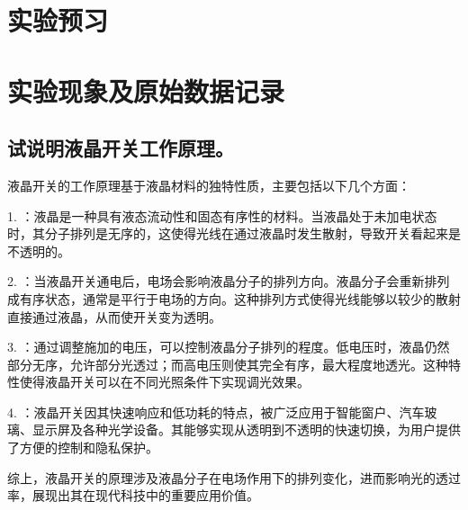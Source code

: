 \documentclass[signature=data]{physicsreport}
\begin{document}
\maketitle

\section{实验预习}


\makeatletter
{}
\makeatother


\section{实验现象及原始数据记录}


\makeatletter
{}
\makeatother

\newpage

\subsection{试说明液晶开关工作原理。}

液晶开关的工作原理基于液晶材料的独特性质，主要包括以下几个方面：

1. ：液晶是一种具有液态流动性和固态有序性的材料。当液晶处于未加电状态时，其分子排列是无序的，这使得光线在通过液晶时发生散射，导致开关看起来是不透明的。

2. ：当液晶开关通电后，电场会影响液晶分子的排列方向。液晶分子会重新排列成有序状态，通常是平行于电场的方向。这种排列方式使得光线能够以较少的散射直接通过液晶，从而使开关变为透明。

3. ：通过调整施加的电压，可以控制液晶分子排列的程度。低电压时，液晶仍然部分无序，允许部分光透过；而高电压则使其完全有序，最大程度地透光。这种特性使得液晶开关可以在不同光照条件下实现调光效果。

4. ：液晶开关因其快速响应和低功耗的特点，被广泛应用于智能窗户、汽车玻璃、显示屏及各种光学设备。其能够实现从透明到不透明的快速切换，为用户提供了方便的控制和隐私保护。

综上，液晶开关的原理涉及液晶分子在电场作用下的排列变化，进而影响光的透过率，展现出其在现代科技中的重要应用价值。
\end{document}
